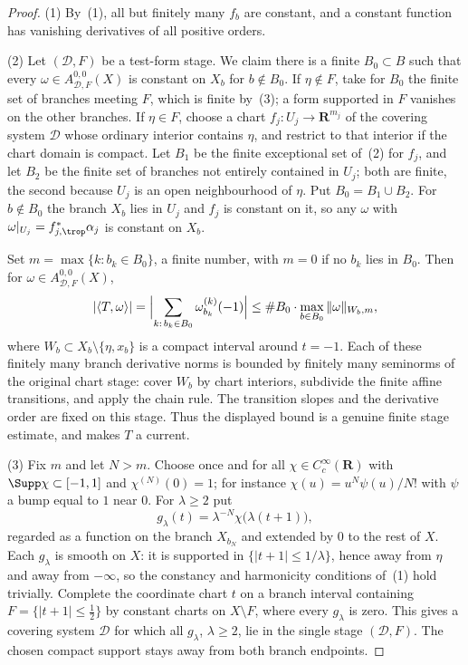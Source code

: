 \begin{proof}
(1) By \,(1), all but finitely many $f_b$ are
constant, and a constant function has vanishing derivatives of all positive
orders.

(2) Let $(\mathscr D,F)$ be a test-form stage.  We claim there is a finite
$B_0\subset B$ such that every $\omega\in A^{0,0}_{\mathscr D,F}(X)$ is
constant on $X_b$ for $b\notin B_0$.  If $\eta\notin F$, take for $B_0$ the
finite set of branches meeting $F$, which is finite by
\,(3); a form supported in $F$ vanishes on the
other branches.  If $\eta\in F$, choose a chart $f_j:U_j\to\mathbf R^{m_j}$
of the covering system $\mathscr D$ whose ordinary interior contains
$\eta$, and restrict to that interior if the chart domain is compact.
Let $B_1$ be the
finite exceptional set of \,(2) for $f_j$, and let
$B_2$ be the finite set of branches not entirely contained in $U_j$; both are
finite, the second because $U_j$ is an open neighbourhood of $\eta$.  Put
$B_0=B_1\cup B_2$.  For $b\notin B_0$ the branch $X_b$ lies in $U_j$ and
$f_j$ is constant on it, so any $\omega$ with
$\omega|_{U_j}=f_{j,\trop}^*\alpha_j$ is constant on $X_b$.

Set $m=\max\{k:b_k\in B_0\}$, a finite number, with $m=0$ if no $b_k$ lies in
$B_0$.  Then for $\omega\in A^{0,0}_{\mathscr D,F}(X)$,
\[
 |\langle T,\omega\rangle|
 =\Bigl|\sum_{k:\,b_k\in B_0}\omega_{b_k}^{(k)}(-1)\Bigr|
 \le\#B_0\cdot\max_{b\in B_0}\|\omega\|_{W_b,m},
\]
where $W_b\subset X_b\setminus\{\eta,x_b\}$ is a compact interval
around $t=-1$. Each of these finitely many branch derivative norms is
bounded by finitely many seminorms of the original chart stage: cover
$W_b$ by chart interiors, subdivide the finite affine transitions, and
apply the chain rule. The transition slopes and the derivative order
are fixed on this stage. Thus the displayed bound is a genuine finite
stage estimate, and  makes
$T$ a current.

(3) Fix $m$ and let $N>m$.  Choose once and for all
$\chi\in C_c^\infty(\mathbf R)$ with $\Supp\chi\subset[-1,1]$ and
$\chi^{(N)}(0)=1$; for instance $\chi(u)=u^N\psi(u)/N!$ with $\psi$ a bump
equal to $1$ near $0$.  For $\lambda\ge2$ put
\[
 g_\lambda(t)=\lambda^{-N}\chi\bigl(\lambda(t+1)\bigr),
\]
regarded as a function on the branch $X_{b_N}$ and extended by $0$ to the
rest of $X$.  Each $g_\lambda$ is smooth on $X$: it is supported in
$\{|t+1|\le1/\lambda\}$, hence away from $\eta$ and away from $-\infty$, so
the constancy and harmonicity conditions of
\,(1) hold trivially.  Complete the coordinate
chart $t$ on a branch interval containing
$F=\{|t+1|\le\tfrac12\}$ by constant charts on $X\setminus F$,
where every $g_\lambda$ is zero. This gives a covering system
$\mathscr D$ for which all $g_\lambda$, $\lambda\ge2$, lie in the
single stage $(\mathscr D,F)$. The chosen compact support stays away
from both branch endpoints.


\end{proof}
